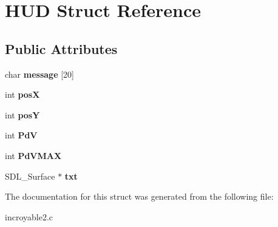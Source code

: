 \hypertarget{structHUD}{}\section{H\+UD Struct Reference}
\label{structHUD}
\subsection*{Public Attributes}
\begin{DoxyCompactItemize}
\item 
\mbox{\label{structHUD_a6a10c2ac67a05b68ab30e7f536c38256}} 
char {\bfseries message} \mbox{[}20\mbox{]}
\item 
\mbox{\label{structHUD_adffafeaf0e21541eb7b181a36bb9102a}} 
int {\bfseries posX}
\item 
\mbox{\label{structHUD_a44e307532988130e2f78ab8bbfb890e8}} 
int {\bfseries posY}
\item 
\mbox{\label{structHUD_a43ea5561b8b806e8a95ef68dec426deb}} 
int {\bfseries PdV}
\item 
\mbox{\label{structHUD_a24350de69d28458555e3404db9b1e748}} 
int {\bfseries Pd\+V\+M\+AX}
\item 
\mbox{\label{structHUD_a83c62b997827fa992c1cf4e0be120edb}} 
S\+D\+L\+\_\+\+Surface $\ast$ {\bfseries txt}
\end{DoxyCompactItemize}


The documentation for this struct was generated from the following file\+:\begin{DoxyCompactItemize}
\item 
incroyable2.\+c\end{DoxyCompactItemize}
